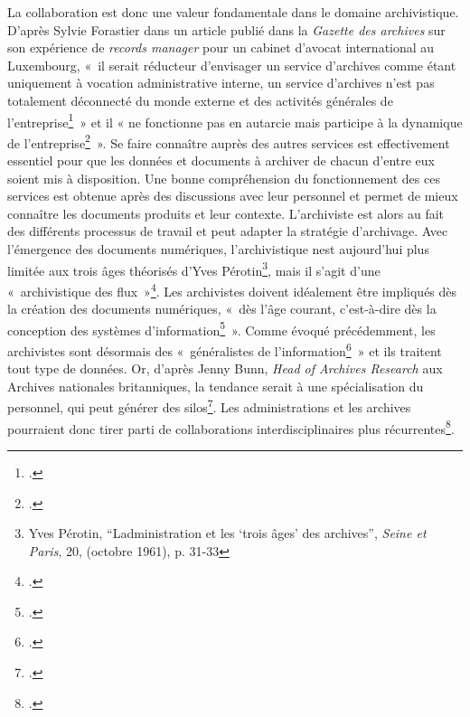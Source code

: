 La collaboration est donc une valeur fondamentale dans le domaine
archivistique. D'après Sylvie Forastier dans un article publié dans la
\emph{Gazette des archives} sur son expérience de \emph{records manager} pour un
cabinet d'avocat international au Luxembourg, «~il serait réducteur
d'envisager un service d'archives comme étant uniquement à vocation
administrative interne, un service d'archives n'est pas totalement
déconnecté du monde externe et des activités générales de
l'entreprise\footcite{forastier_archiviste_2015}~» et il « ne fonctionne pas en autarcie
mais participe à la dynamique de l'entreprise\footcite{forastier_archiviste_2015}~». Se faire connaître auprès des autres services est
effectivement essentiel pour que les données et documents à archiver de
chacun d'entre eux soient mis à disposition. Une bonne compréhension du
fonctionnement des ces services est obtenue après des discussions avec
leur personnel et permet de mieux connaître les documents produits et
leur contexte. L'archiviste est alors au fait des différents processus
de travail et peut adapter la stratégie d'archivage. Avec l'émergence
des documents numériques, l'archivistique n\textquotesingle est
aujourd'hui plus limitée aux trois âges théorisés d'Yves
Pérotin\footnote{Yves Pérotin, \enquote{L\textquotesingle administration et les \enquote{trois âges} des archives}, \emph{Seine et Paris}, 20, (octobre 1961), p. 31-33}, mais il s'agit d'une «~archivistique des flux~»\footcite{guyon_archivistique_2022}. Les archivistes doivent idéalement être impliqués dès
la création des documents numériques, «~dès l'âge courant, c'est-à-dire
dès la conception des systèmes d'information\footcite{guyon_archivistique_2022}~». Comme évoqué précédemment, les
archivistes sont désormais des «~généralistes de
l'information\footcite{banat-berger__2012}~» et ils traitent tout type
de données. Or, d'après Jenny Bunn, \emph{Head of Archives Research} aux
Archives nationales britanniques, la tendance serait à une
spécialisation du personnel, qui peut générer des silos\footcite{jaillant_are_2024}. Les administrations et les archives pourraient donc tirer
parti de collaborations interdisciplinaires plus récurrentes\footcite{jaillant_are_2024}.\newline

